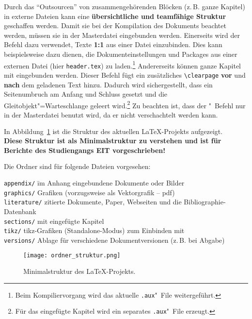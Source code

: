 Durch das "`Outsourcen"' von zusammengehörenden Blöcken (z.\,B. ganze Kapitel) in externe Dateien kann eine \textbf{übersichtliche und teamfähige Struktur} geschaffen werden. Damit sie bei der Kompilation des Dokuments beachtet werden, müssen sie in der Masterdatei eingebunden werden.
Einerseits wird der Befehl \verb|| dazu verwendet, Texte \textbf{1:1} aus einer Datei einzubinden. Dies kann beispielsweise dazu dienen, die Dokumenteinstellungen und Packages aus einer externen Datei (hier \mbox{\texttt{header.tex}}) zu laden.\footnote{Beim Kompiliervorgang wird das aktuelle \texttt{.aux}"~File weitergeführt.}
Andererseits können ganze Kapitel mit \verb|| eingebunden werden. Dieser Befehl fügt ein zusätzliches \verb|\clearpage| \textbf{vor} und \textbf{nach} dem geladenen Text hinzu. Dadurch wird sichergestellt, dass ein Seitenumbruch am Anfang und Schluss gesetzt und die Gleitobjekt"=Warteschlange geleert wird.\footnote{Für das eingefügte Kapitel wird ein separates \texttt{.aux}"~File erzeugt.} Zu beachten ist, dass der \verb||"~Befehl nur in der Masterdatei benutzt wird, da er nicht verschachtelt werden kann. 

In Abbildung~\ref{fig:Struktur} ist die Struktur des aktuellen \LaTeX-Projekts aufgezeigt.\\
\textbf{Diese Struktur ist als Minimalstruktur zu verstehen und ist für Berichte des Studiengangs EIT vorgeschrieben!}

\clearpage 

Die Ordner sind für folgende Dateien vorgesehen:
\begin{tabbing}
\quad \= \verb|appendix/| \qquad \= im Anhang eingebundene Dokumente oder Bilder\\
      \> \verb|graphics/|        \> Grafiken (vorzugsweise als Vektorgrafik -- pdf)\\
      \> \verb|literature/|      \> zitierte Dokumente, Paper, Webseiten und die Bibliographie-Datenbank\\
      \> \verb|sections/|        \> mit \verb|| eingefügte Kapitel\\
      \> \verb|tikz/|            \> tikz-Grafiken (Standalone-Modus) zum Einbinden mit \verb||\\
      \> \verb|versions/|        \> Ablage für verschiedene Dokumentversionen (z.\,B. bei Abgabe)
\end{tabbing} 

\begin{figure}
\centering
\texttt{[image: ordner\_struktur.png]}
\caption{Minimalstruktur des \LaTeX -Projekts.}\label{fig:Struktur}
\end{figure}


